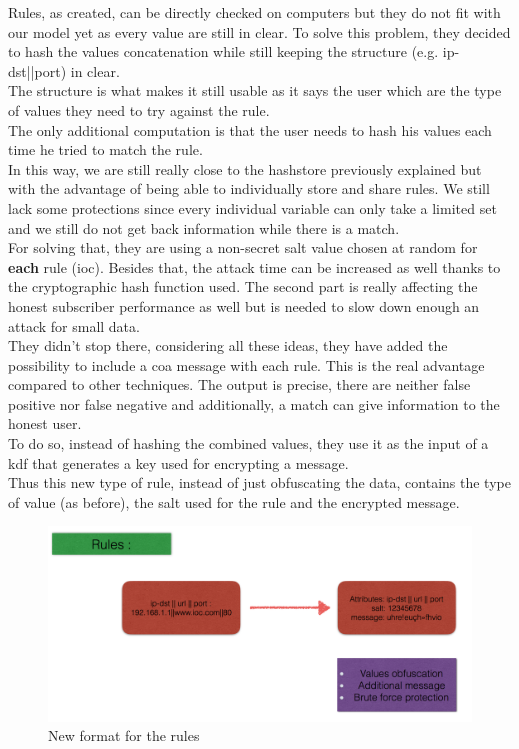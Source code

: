 \documentclass{eplmastersthesis}
\begin{document}
Rules, as created, can be directly checked on computers but they do not fit with our model yet as every value are still in clear. To solve this problem, they decided to hash the values concatenation while still keeping the structure (e.g. ip-dst||port) in clear.\\
The structure is what makes it still usable as it says the user which are the type of values they need to try against the rule.\\
The only additional computation is that the user needs to hash his values each time he tried to match the rule.\\
In this way, we are still really close to the hashstore previously explained but with the advantage of being able to individually store and share rules. We still lack some protections since every individual variable can only take a limited set and we still do not get back information while there is a match.\\
For solving that, they are using a non-secret salt value chosen at random for \textbf{each} rule (\gls{ioc}). Besides that, the attack time can be increased as well thanks to the cryptographic hash function used. The second part is really affecting the honest subscriber performance as well but is needed to slow down enough an attack for small data.\\

They didn't stop there, considering all these ideas, they have added the possibility to include a \gls{coa} message with each rule. This is the real advantage compared to other techniques. The output is precise, there are neither false positive nor false negative and additionally, a match can give information to the honest user.\\ To do so, instead of hashing the combined values, they use it as the input of a \gls{kdf} that generates a key used for encrypting a message.\\
Thus this new type of rule, instead of just obfuscating the data, contains the type of value (as before), the salt used for the rule and the encrypted message.\\


\begin{figure}[h!]
\begin{center}
	\includegraphics[scale=0.5]{res/obfuscation-rule}
	\caption{New format for the rules}
	\label{Obfuscation-Rule}
\end{center}
\end{figure}
\end{document}
